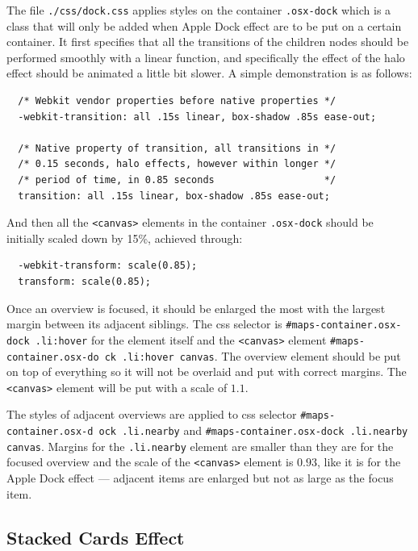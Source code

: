 The file \texttt{./css/dock.css} applies styles on the container \texttt{.osx-dock} which is a class that will only be added when Apple Dock effect are to be put on a certain container. It first specifies that all the transitions of the children nodes should be performed smoothly with a linear function, and specifically the effect of the halo effect should be animated a little bit slower. A simple demonstration is as follows:

\begin{verbatim}
  /* Webkit vendor properties before native properties */
  -webkit-transition: all .15s linear, box-shadow .85s ease-out;

  /* Native property of transition, all transitions in */
  /* 0.15 seconds, halo effects, however within longer */
  /* period of time, in 0.85 seconds                   */
  transition: all .15s linear, box-shadow .85s ease-out;
\end{verbatim}

And then all the \texttt{<canvas>} elements in the container \texttt{.osx-dock} should be initially scaled down by 15\%, achieved through:

\begin{verbatim}
  -webkit-transform: scale(0.85);
  transform: scale(0.85);
\end{verbatim}

Once an overview is focused, it should be enlarged the most with the largest margin between its adjacent siblings. The \gls{css} selector is \texttt{\#maps-container.osx-dock .li:hover} for the element itself and the \texttt{<canvas>} element \texttt{\#maps-container.osx-do ck .li:hover canvas}. The overview element should be put on top of everything so it will not be overlaid and put with correct margins. The \texttt{<canvas>} element will be put with a scale of $1.1$.

The styles of adjacent overviews are applied to \gls{css} selector \texttt{\#maps-container.osx-d ock .li.nearby} and \texttt{\#maps-container.osx-dock .li.nearby canvas}. Margins for the \texttt{.li.nearby} element are smaller than they are for the focused overview and the scale of the \texttt{<canvas>} element is $0.93$, like it is for the Apple Dock effect --- adjacent items are enlarged but not as large as the focus item.

\subsection{Stacked Cards Effect}
\label{chap4:cards}

